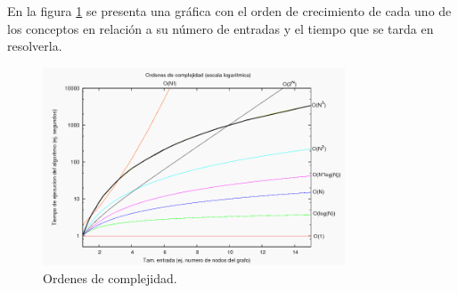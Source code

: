 En la figura \ref {fig:Ordenes_de_complejidad} se presenta una gráfica con el orden de crecimiento de cada uno de los conceptos en relación a su número de entradas y el tiempo que se tarda en resolverla.\\
\begin{figure}[hbtp]
    \centering
        \includegraphics[width=0.8\textwidth]{MarcoTeorico/Imagenes/Ordenes_de_complejidad.png}
        \caption{Ordenes de complejidad.}      
        \label{fig:Ordenes_de_complejidad}
\end{figure}   

